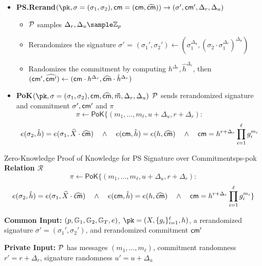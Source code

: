 {\begin{itemize}
    \item \textbf{PS.Rerand}$(\pk, \sigma = (\sigma_1, \sigma_2), \cm = (\cm, \widehat{\cm}) ) \to (\sigma', \cm', \Delta_r, \Delta_u)$
    \begin{itemize}
        \item $\mathcal{P}$ samples $\Delta_r, \Delta_u \sample \Z_p$
        \item Rerandomizes the signature $\sigma'$ = $(\sigma_1', \sigma_2') \gets (\sigma_1^{\Delta_u}, (\sigma_2\cdot \sigma_1^{\Delta_r})^{\Delta_u})$
        \item Randomizes the commitment by computing $h^{\Delta_r}, \hat{h}^{\Delta_r}$, then  $(\mathsf{cm}', \widehat{\mathsf{cm}'}) \gets (\mathsf{cm} \cdot h^{\Delta_r}, \widehat{\mathsf{cm}}\cdot \hat{h}^{\Delta_r})$
    \end{itemize}

    \item \textbf{PoK}$(\pk, \sigma = (\sigma_1, \sigma_2), \cm, \widehat{\cm}, \vec{m}, \Delta_r, \Delta_u)$ $\mathcal{P}$ sends rerandomized signature and commitment $\sigma', \mathsf{cm}'$ and $\pi$ 
    \[
       \pi \gets \mathsf{PoK}\{(m_1,\ldots,m_\ell, u+\Delta_u, r+\Delta_r): 
    \]
    \[
        e(\sigma_2, \hat{h}) = e(\sigma_1, \widehat{X} \cdot \widehat{\mathsf{cm}}) \quad \wedge \quad e(\mathsf{cm}, \hat{h}) = e(h, \widehat{\mathsf{cm}})  \quad \wedge \quad \mathsf{cm} = h^{r+\Delta_r} \prod_{i=1}^\ell g_i^{m_i}
    \]
    
\end{itemize}


\newpage
\begin{protocol}{Zero-Knowledge Proof of Knowledge for PS Signature over Commitments}{ps-pok}
    \textbf{Relation $\mathcal{R}$}
    \[
        \pi \gets \mathsf{PoK}\{(m_1,\ldots,m_\ell, u+\Delta_u, r+\Delta_r): 
    \]
    \[
         e(\sigma_2, \hat{h}) = e(\sigma_1, \widehat{X} \cdot \widehat{\mathsf{cm}}) \quad \wedge \quad
        e(\mathsf{cm}, \hat{h}) = e(h, \widehat{\mathsf{cm}}) \quad \wedge \quad
        \mathsf{cm} = h^{r+\Delta_r} \prod_{i=1}^\ell g_i^{m_i}
        \}
    \]
    
    \textbf{Common Input:} $(p, \mathbb{G}_1, \mathbb{G}_2, \mathbb{G}_T, e)$, $\pk = (X, \{g_i\}_{i=1}^\ell, h)$, a rerandomized signature $\sigma' = (\sigma_1', \sigma_2')$, and rerandomized commitment $\mathsf{cm}'$
    
    \textbf{Private Input:} $\mathcal{P}$ has messages $(m_1,\ldots,m_\ell)$, commitment randomness $r' = r + \Delta_r$, signature randomness $u' = u + \Delta_u$
    

\end{protocol}}
